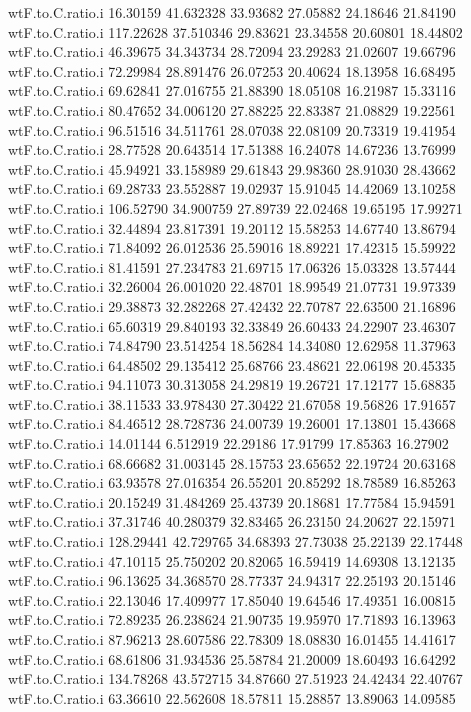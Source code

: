 \documentclass[11pt]{article} %
\begin{document}
\begin{Schunk}
\begin{Soutput}
wtF.to.C.ratio.i  16.30159 41.632328 33.93682 27.05882 24.18646 21.84190
wtF.to.C.ratio.i 117.22628 37.510346 29.83621 23.34558 20.60801 18.44802
wtF.to.C.ratio.i  46.39675 34.343734 28.72094 23.29283 21.02607 19.66796
wtF.to.C.ratio.i  72.29984 28.891476 26.07253 20.40624 18.13958 16.68495
wtF.to.C.ratio.i  69.62841 27.016755 21.88390 18.05108 16.21987 15.33116
wtF.to.C.ratio.i  80.47652 34.006120 27.88225 22.83387 21.08829 19.22561
wtF.to.C.ratio.i  96.51516 34.511761 28.07038 22.08109 20.73319 19.41954
wtF.to.C.ratio.i  28.77528 20.643514 17.51388 16.24078 14.67236 13.76999
wtF.to.C.ratio.i  45.94921 33.158989 29.61843 29.98360 28.91030 28.43662
wtF.to.C.ratio.i  69.28733 23.552887 19.02937 15.91045 14.42069 13.10258
wtF.to.C.ratio.i 106.52790 34.900759 27.89739 22.02468 19.65195 17.99271
wtF.to.C.ratio.i  32.44894 23.817391 19.20112 15.58253 14.67740 13.86794
wtF.to.C.ratio.i  71.84092 26.012536 25.59016 18.89221 17.42315 15.59922
wtF.to.C.ratio.i  81.41591 27.234783 21.69715 17.06326 15.03328 13.57444
wtF.to.C.ratio.i  32.26004 26.001020 22.48701 18.99549 21.07731 19.97339
wtF.to.C.ratio.i  29.38873 32.282268 27.42432 22.70787 22.63500 21.16896
wtF.to.C.ratio.i  65.60319 29.840193 32.33849 26.60433 24.22907 23.46307
wtF.to.C.ratio.i  74.84790 23.514254 18.56284 14.34080 12.62958 11.37963
wtF.to.C.ratio.i  64.48502 29.135412 25.68766 23.48621 22.06198 20.45335
wtF.to.C.ratio.i  94.11073 30.313058 24.29819 19.26721 17.12177 15.68835
wtF.to.C.ratio.i  38.11533 33.978430 27.30422 21.67058 19.56826 17.91657
wtF.to.C.ratio.i  84.46512 28.728736 24.00739 19.26001 17.13801 15.43668
wtF.to.C.ratio.i  14.01144  6.512919 22.29186 17.91799 17.85363 16.27902
wtF.to.C.ratio.i  68.66682 31.003145 28.15753 23.65652 22.19724 20.63168
wtF.to.C.ratio.i  63.93578 27.016354 26.55201 20.85292 18.78589 16.85263
wtF.to.C.ratio.i  20.15249 31.484269 25.43739 20.18681 17.77584 15.94591
wtF.to.C.ratio.i  37.31746 40.280379 32.83465 26.23150 24.20627 22.15971
wtF.to.C.ratio.i 128.29441 42.729765 34.68393 27.73038 25.22139 22.17448
wtF.to.C.ratio.i  47.10115 25.750202 20.82065 16.59419 14.69308 13.12135
wtF.to.C.ratio.i  96.13625 34.368570 28.77337 24.94317 22.25193 20.15146
wtF.to.C.ratio.i  22.13046 17.409977 17.85040 19.64546 17.49351 16.00815
wtF.to.C.ratio.i  72.89235 26.238624 21.90735 19.95970 17.71893 16.13963
wtF.to.C.ratio.i  87.96213 28.607586 22.78309 18.08830 16.01455 14.41617
wtF.to.C.ratio.i  68.61806 31.934536 25.58784 21.20009 18.60493 16.64292
wtF.to.C.ratio.i 134.78268 43.572715 34.87660 27.51923 24.42434 22.40767
wtF.to.C.ratio.i  63.36610 22.562608 18.57811 15.28857 13.89063 14.09585

\end{Soutput}
\end{Schunk}
\end{document}
